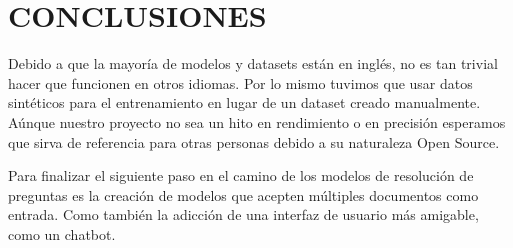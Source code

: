 \documentclass[../main.tex]{subfiles}
\begin{document}
\chapter{CONCLUSIONES}

Debido a que la mayoría de modelos y datasets están en inglés, no es tan trivial hacer que funcionen en otros idiomas.
Por lo mismo tuvimos que usar datos sintéticos para el entrenamiento en lugar de un dataset creado manualmente.
Aúnque nuestro proyecto no sea un hito en rendimiento o en precisión esperamos que sirva de referencia para otras personas debido a su naturaleza Open Source.

Para finalizar el siguiente paso en el camino de los modelos de resolución de preguntas es la creación de modelos que acepten múltiples documentos como entrada.
Como también la adicción de una interfaz de usuario más amigable, como un chatbot.

%
%
\end{document}
